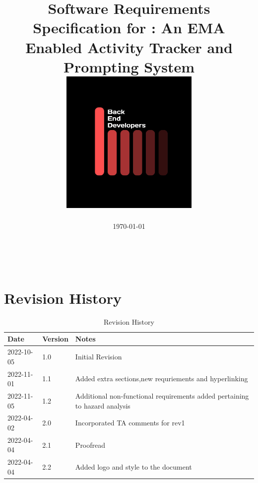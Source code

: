 \documentclass[12pt]{article}
\begin{document}
\title{\textbf{Software Requirements Specification for \progname: An EMA Enabled Activity Tracker and Prompting System\\ \vspace{2cm} \includegraphics[width=0.5\textwidth]{../logo.jpg}}}
 \pagecolor{black}\afterpage{\nopagecolor}
\author{\authname}
\date{\today}

\color{white}\maketitle
\color{black}


\tableofcontents
\listoffigures
\listoftables
~\newpage

\section*{Revision History}

\begin{table}[H]
	\begin{tabularx}{\textwidth}{p{4cm}p{2cm}X}
	  \toprule {\bf Date} 		  & {\bf Version}	 & {\bf Notes} \\
	  \midrule
	  2022-10-05          & 1.0           		& Initial Revision       \\
	  2022-11-01		  & 1.1           		& Added extra sections,new requriements and hyperlinking\\   
	  2022-11-05           & 1.2                       & Additional non-functional requirements added pertaining to hazard analysis\\
	2022-04-02 & 2.0 & Incorporated TA comments for rev1 \\
	2022-04-04 & 2.1 & Proofread\\
	2022-04-04 & 2.2 & Added logo and style to the document \\
	  \bottomrule
	\end{tabularx}
	\caption{\label{revHist}Revision History}
\end{table}
~\newpage
\pagebreak
\end{document}
